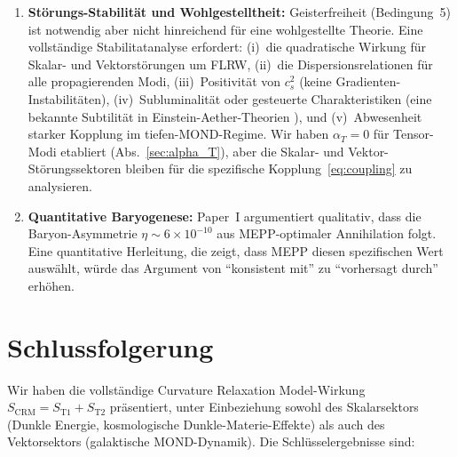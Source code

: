 \documentclass[aps,prd,twocolumn,superscriptaddress,nofootinbib]{revtex4-2}
\begin{document}
\begin{enumerate}
\item \textbf{St\"orungs-Stabilit\"at und Wohlgestelltheit:} Geisterfreiheit (Bedingung~5) ist notwendig aber nicht hinreichend f\"ur eine wohlgestellte Theorie. Eine vollst\"andige Stabilitatanalyse erfordert: (i)~die quadratische Wirkung f\"ur Skalar- und Vektorst\"orungen um FLRW, (ii)~die Dispersionsrelationen f\"ur alle propagierenden Modi, (iii)~Positivit\"at von $c_s^2$ (keine Gradienten-Instabilit\"aten), (iv)~Subluminalit\"at oder gesteuerte Charakteristiken (eine bekannte Subtilit\"at in Einstein-Aether-Theorien \cite{JacobsonMattingly2001}), und (v)~Abwesenheit starker Kopplung im tiefen-MOND-Regime. Wir haben $\alpha_T = 0$ f\"ur Tensor-Modi etabliert (Abs.~\ref{sec:alpha_T}), aber die Skalar- und Vektor-St\"orungssektoren bleiben f\"ur die spezifische Kopplung~\eqref{eq:coupling} zu analysieren.

\item \textbf{Quantitative Baryogenese:} Paper~I argumentiert qualitativ, dass die Baryon-Asymmetrie $\eta \sim 6 \times 10^{-10}$ aus MEPP-optimaler Annihilation folgt. Eine quantitative Herleitung, die zeigt, dass MEPP diesen spezifischen Wert ausw\"ahlt, w\"urde das Argument von ``konsistent mit'' zu ``vorhersagt durch'' erh\"ohen.
\end{enumerate}


\section{Schlussfolgerung}
\label{sec:conclusion}

Wir haben die vollst\"andige Curvature Relaxation Model-Wirkung $S_{\mathrm{CRM}} = S_{\mathrm{T1}} + S_{\mathrm{T2}}$ pr\"asentiert, unter Einbeziehung sowohl des Skalarsektors (Dunkle Energie, kosmologische Dunkle-Materie-Effekte) als auch des Vektorsektors (galaktische MOND-Dynamik). Die Schl\"usselergebnisse sind:
\end{document}
